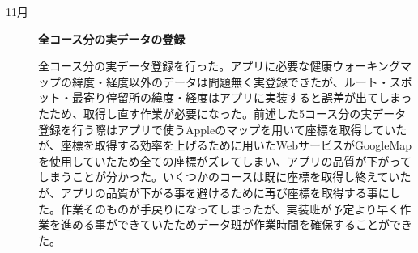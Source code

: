 ﻿\begin{description}
 \item[11月] \textbf{全コース分の実データの登録}\par
 全コース分の実データ登録を行った。アプリに必要な健康ウォーキングマップの緯度・経度以外のデータは問題無く実登録できたが、ルート・スポット・最寄り停留所の緯度・経度はアプリに実装すると誤差が出てしまったため、取得し直す作業が必要になった。前述した5コース分の実データ登録を行う際はアプリで使うAppleのマップを用いて座標を取得していたが、座標を取得する効率を上げるために用いたWebサービスがGoogleMapを使用していたため全ての座標がズレてしまい、アプリの品質が下がってしまうことが分かった。いくつかのコースは既に座標を取得し終えていたが、アプリの品質が下がる事を避けるために再び座標を取得する事にした。作業そのものが手戻りになってしまったが、実装班が予定より早く作業を進める事ができていたためデータ班が作業時間を確保することができた。
  \par

\end{description}
